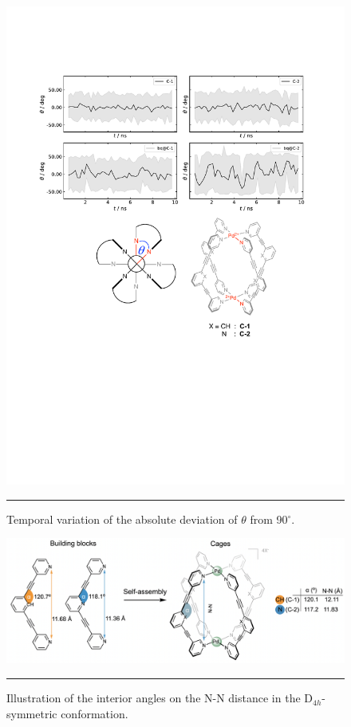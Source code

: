 \documentclass[../../main.tex]{subfiles}
\begin{document}
\begin{figure}[h!]
	\vspace{0.4cm}
	\centering
	\includegraphics[width=\textwidth]{3/da//figs/figS6}
	\vspace{0.2cm}
	\hrule
	\caption{Temporal variation of the absolute deviation of $\theta$ from 90${}^\circ$.}
	\label{fig::si_da_6}
\end{figure}


\begin{figure}[h!]
	\vspace{0.4cm}
	\centering
	\includegraphics[width=\textwidth]{3/da//figs/figS7}
	\vspace{0.2cm}
	\hrule
	\caption{Illustration of the interior angles on the N-N distance in the D$_{4h}$-symmetric conformation.}
	\label{fig::si_da_7}
\end{figure}
\end{document}
